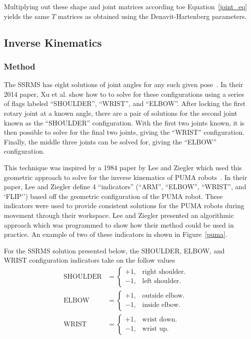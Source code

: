 \documentclass{article}
\begin{document}
Multiplying out these shape and joint matrices according toe Equation~\ref{joint_eq} yields the same $T$ matrices as obtained using the Denavit-Hartenberg parameters.

\subsection{Inverse Kinematics}
\subsubsection{Method}
The SSRMS has eight solutions of joint angles for any such given pose~\cite{xu2014analytical}.
In their 2014 paper, Xu et al. show how to to solve for these configurations using a series of flags labeled ``SHOULDER'', ``WRIST'', and ``ELBOW''.
After locking the first rotary joint at a known angle, there are a pair of solutions for the second joint known as the ``SHOULDER'' configuration.
With the first two joints known, it is then possible to solve for the final two joints, giving the ``WRIST'' configuration.
Finally, the middle three joints can be solved for, giving the ``ELBOW'' configuration.

This technique was inspired by a 1984 paper by Lee and Ziegler which used this geometric approach to solve for the inverse kinematics of PUMA robots~\cite{lee1984geometric}.
In their paper, Lee and Ziegler define 4 ``indicators'' (``ARM'', ``ELBOW'', ``WRIST'', and `FLIP'') based off the geometric configuration of the PUMA robot.
These indicators were used to provide consistent solutions for the PUMA robots during movement through their workspace.
Lee and Ziegler presented an algorithmic approach which was programmed to show how their method could be used in practice.
An example of two of these indicators in shown in Figure~\ref{puma}.

For the SSRMS solution presented below, the SHOULDER, ELBOW, and WRIST configuration indicators take on the follow values~\cite{xu2014analytical}
\begin{align*}
\text{SHOULDER}&=\begin{cases}
	+1, & \text{right shoulder}.\\
	-1, & \text{left shoulder}.
\end{cases}\\
\text{ELBOW}&=\begin{cases}
	+1, & \text{outside elbow}.\\
	-1, & \text{inside elbow}.
\end{cases}\\
\text{WRIST}&=\begin{cases}
	+1, & \text{wrist down}.\\
	-1, & \text{wrist up}.
\end{cases}
\end{align*}
\end{document}
